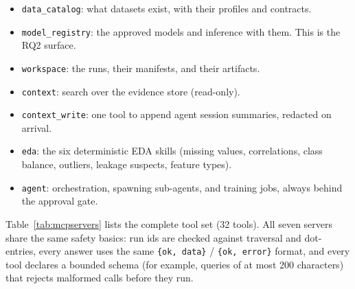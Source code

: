 \begin{itemize}
	\item \texttt{data\_catalog}: what datasets exist, with their profiles and contracts.
	\item \texttt{model\_registry}: the approved models and inference with them. This is the RQ2 surface.
	\item \texttt{workspace}: the runs, their manifests, and their artifacts.
	\item \texttt{context}: search over the evidence store (read-only).
	\item \texttt{context\_write}: one tool to append agent session summaries, redacted on arrival.
	\item \texttt{eda}: the six deterministic EDA skills (missing values, correlations, class balance, outliers, leakage suspects, feature types).
	\item \texttt{agent}: orchestration, spawning sub-agents, and training jobs, always behind the approval gate.
\end{itemize}

Table~\ref{tab:mcpservers} lists the complete tool set (32 tools). All seven servers share the same safety basics: run ids are checked against traversal and dot-entries, every answer uses the same \texttt{\{ok, data\}} / \texttt{\{ok, error\}} format, and every tool declares a bounded schema (for example, queries of at most 200 characters) that rejects malformed calls before they run.

